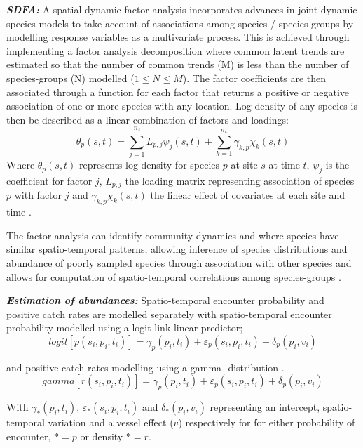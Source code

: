 \documentclass{nature}
\begin{document}
\begin{linenumbers}
\textbf{\textit{SDFA:}} A spatial dynamic factor analysis incorporates
advances in joint dynamic species models \cite{Thorson2017} to take account
of associations among species / species-groups by modelling response variables
as a multivariate process. This is achieved through implementing a factor
analysis decomposition where common latent trends are estimated so that the
number of common trends (M) is less than the number of species-groups (N)
modelled ($1 \leq N \leq M$). The factor coefficients are then associated
through a function for each factor that returns a positive or negative
association of one or more species with any location. Log-density of any
species is then be described as a linear combination of factors and loadings:
	\begin{equation}
		\theta_{p}(s,t) = \sum_{j=1}^{n_{j}}
		L_{p,j}\psi_{j}(s,t) +\sum_{k=1}^{n_{k}}
		\gamma_{k,p}\chi_{k}(s,t)
	\end{equation}
Where $\theta_{p}(s,t)$ represents log-density for species $p$ at site $s$ at
time $t$, $\psi_{j}$ is the coefficient for factor $j$, $L_{p,j}$ the loading
matrix representing association of species $p$ with factor $j$ and
$\gamma_{k,p}\chi_{k}(s,t)$ the linear effect of covariates at each site and
time \cite{Thorson2016b}. 

The factor analysis can identify community dynamics and where species have
similar spatio-temporal patterns, allowing inference of species distributions
and abundance of poorly sampled species through association with other species
and allows for computation of spatio-temporal correlations among species-groups
\cite{Thorson2016b}.

\textbf{\textit{Estimation of abundances:}} Spatio-temporal encounter
probability and positive catch rates are modelled separately with
spatio-temporal encounter probability modelled using a logit-link linear
predictor;
		\begin{equation}
			logit[p(s_{i},p_{i},t_{i})] = \gamma_{p}(p_{i},t_{i}) +
			\varepsilon_{p}(s_{i},p_{i},t_{i}) + \delta_{p}(p_{i},
			v_{i})
		\end{equation}

and positive catch rates modelling using a gamma- distribution \cite{Thorson2015a}.  
		\begin{equation}
			gamma[r(s_{i},p_{i},t_{i})] = \gamma_{p}(p_{i},t_{i}) +
			\varepsilon_{p}(s_{i},p_{i},t_{i}) + \delta_{p}(p_{i},
			v_{i})
		\end{equation}

With $\gamma_{*}(p_{i},t_{i})$, $\varepsilon_{*}(s_{i},p_{i},t_{i})$ and
$\delta_{*}(p_{i}, v_{i})$ representing an intercept, spatio-temporal variation
and a vessel effect ($v$) respectively for for either probability of encounter,
$* = p$ or density $* = r$.


\end{linenumbers}
\end{document}
